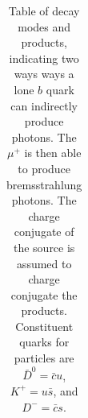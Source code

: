 \begin{table}
\begin{tabular}{lcll}
    \end{tabular}
    \caption[$b$ Quark Production of Photons]{
      Table of decay modes and products, indicating two ways ways a lone $b$ quark can indirectly produce photons.
      The $\mu^+$ is then able to produce bremsstrahlung photons.
      The charge conjugate of the source is assumed to charge conjugate the products.
      Constituent quarks for particles are $\bar{D}^0=\bar{c}u$, $K^+=u\bar{s}$, and $D^-=\bar{c}s$.
      }
    \label{tab:bpaths}
    \end{table}
    
